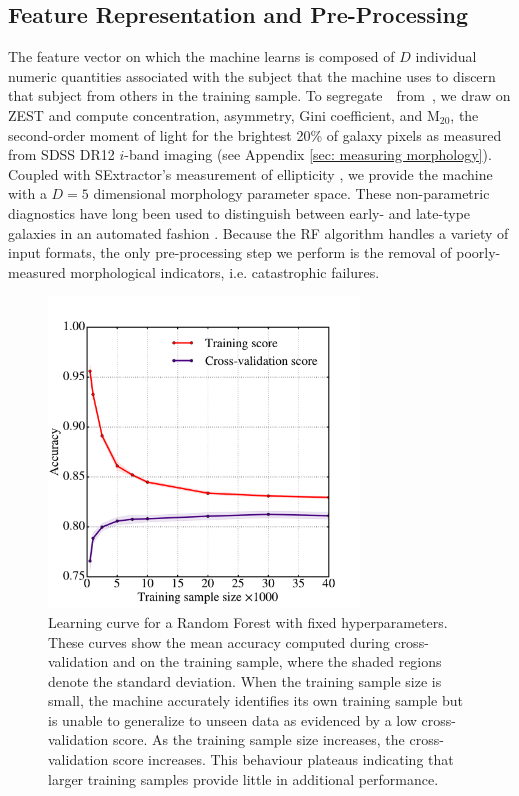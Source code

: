 \subsection{Feature Representation and Pre-Processing}
The feature vector on which the machine learns is composed of $D$ individual 
numeric quantities associated with the subject that the machine uses to discern 
that subject from others in the training sample. 
To segregate~\feat~from~\notfeat, we draw on ZEST \citep{Scarlata2007} and compute
 concentration, asymmetry, Gini coefficient, and M$_{20}$, 
the second-order moment of light for the brightest 20\% of galaxy pixels as
measured from SDSS DR12 $i$-band imaging (see Appendix \ref{sec: measuring morphology}). 
Coupled with SExtractor's measurement of ellipticity \citep{sextractor}, 
we provide the machine with a $D=5$ dimensional morphology parameter space.
These non-parametric diagnostics have long been used to distinguish between early- and late-type galaxies 
in an automated fashion \cite[e.g.,][]{Abraham1996, Bershady2000, Conselice2000, Abraham2003, Conselice2003, Lotz2004, Snyder2015}.
Because the RF algorithm handles a variety of input formats, the only pre-processing 
step we perform is the removal of poorly-measured morphological indicators, i.e. catastrophic failures.



\begin{figure}[t!]
\includegraphics[width=3.25in]{Figures/human_machine/f6.pdf}
\caption[Random Forest learning curve]{Learning curve for a Random Forest with fixed hyperparameters. These curves show the mean accuracy computed during cross-validation and on the training sample, where the shaded regions denote the standard deviation. When the training sample size is small, the machine accurately identifies its own training sample but is unable to generalize to unseen data as evidenced by a low cross-validation score. As the training sample size increases, the cross-validation score increases. This behaviour plateaus indicating that larger training samples provide little in additional performance. \label{fig: learning curve}}
\end{figure}


